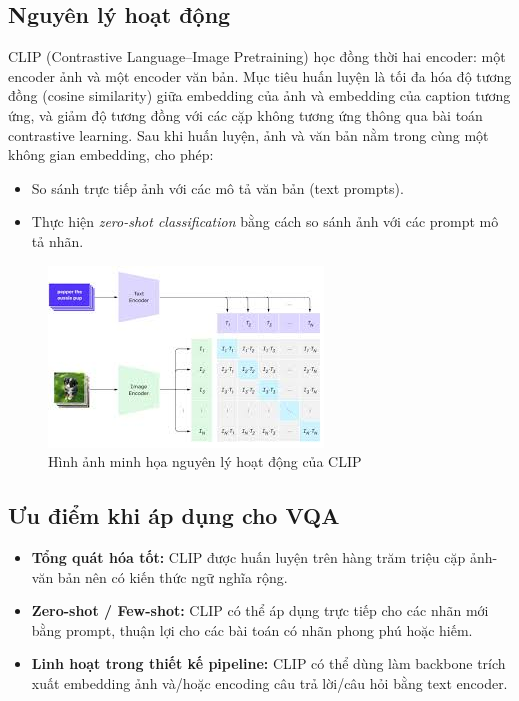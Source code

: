 \subsection{Nguyên lý hoạt động}
CLIP (Contrastive Language–Image Pretraining) học đồng thời hai encoder: một encoder ảnh và một encoder văn bản. Mục tiêu huấn luyện là tối đa hóa độ tương đồng (cosine similarity) giữa embedding của ảnh và embedding của caption tương ứng, và giảm độ tương đồng với các cặp không tương ứng thông qua bài toán contrastive learning. Sau khi huấn luyện, ảnh và văn bản nằm trong cùng một không gian embedding, cho phép:
\begin{itemize}
    \item So sánh trực tiếp ảnh với các mô tả văn bản (text prompts).
    \item Thực hiện \emph{zero-shot classification} bằng cách so sánh ảnh với các prompt mô tả nhãn.
\end{itemize}

\begin{figure}[!hbt]
    \centering
    \includegraphics[width=1.0\linewidth]{graphics/chapter2/CLIP_model.jpg}
    \caption{Hình ảnh minh họa nguyên lý hoạt động của CLIP}
\end{figure}
\subsection{Ưu điểm khi áp dụng cho VQA}
\begin{itemize}
    \item \textbf{Tổng quát hóa tốt:} CLIP được huấn luyện trên hàng trăm triệu cặp ảnh-văn bản nên có kiến thức ngữ nghĩa rộng.
    \item \textbf{Zero-shot / Few-shot:} CLIP có thể áp dụng trực tiếp cho các nhãn mới bằng prompt, thuận lợi cho các bài toán có nhãn phong phú hoặc hiếm.
    \item \textbf{Linh hoạt trong thiết kế pipeline:} CLIP có thể dùng làm backbone trích xuất embedding ảnh và/hoặc encoding câu trả lời/câu hỏi bằng text encoder.
\end{itemize}


